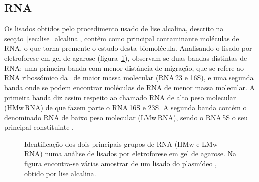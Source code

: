 \subsection{RNA} %
\label{sub:rna_pra}
Os lisados obtidos pelo procedimento usado de lise alcalina, descrito na secção~\ref{sec:lise_alcalina}, contêm como principal contaminante moléculas de RNA, o que torna premente o estudo desta biomolécula. Analisando o lisado por eletroforese em gel de agarose (figura~\ref{fig:ef_pra}), observam-se duas bandas distintas de RNA: uma primeira banda com menor distância de migração, que se refere ao RNA ribossómico da \ecoli\ de maior massa molecular (RNA\,23 e 16S), e uma segunda banda onde se podem encontrar moléculas de RNA de menor massa molecular. A primeira banda diz assim respeito ao chamado RNA de alto peso molecular (HMw\,RNA) de que fazem parte o RNA\,16S e 23S. A segunda banda contém o denominado RNA de baixo peso molecular (LMw\,RNA), sendo o RNA\,5S o seu principal constituinte \cite{meu3}.
\begin{figure}
	\centering
	
	\caption[Identificação dos tipos de RNA na análise de AGE]{Identificação dos dois principais grupos de RNA (HMw e LMw\,RNA) numa análise de lisados por eletroforese em gel de agarose. Na figura encontra-se várias amostrar de um lisado do plasmídeo \pVAX, obtido por lise alcalina.}
	\label{fig:ef_pra}
\end{figure}

